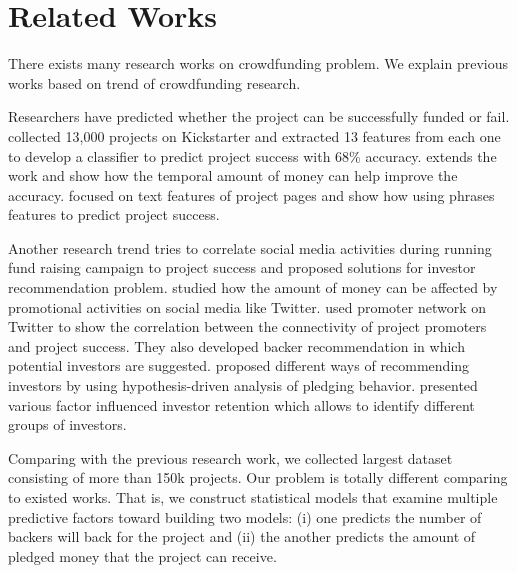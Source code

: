 \section{Related Works}
There exists many research works on crowdfunding problem. We explain previous works based on trend of crowdfunding research.

Researchers have predicted whether the project can be successfully funded or fail. \cite{greenberg2015public} collected 13,000 projects on Kickstarter and extracted 13 features from each one to develop a classifier to predict project success with 68\% accuracy. \cite{Etter:2013} extends the work and show how the temporal amount of money can help improve the accuracy. \cite{Mitra:2014} focused on text features of project pages and show how using phrases features to predict project success.

Another research trend tries to correlate social media activities during running fund raising campaign to project success and proposed solutions for investor recommendation problem. \cite{lu:2014} studied how the amount of money can be  affected by promotional activities on social media like Twitter. \cite{Rakesh:2015} used promoter network on Twitter to show the correlation between the connectivity of project promoters and project success. They also developed backer recommendation in which potential investors are suggested. \cite{an2014recommending} proposed different ways of recommending investors by using hypothesis-driven analysis of pledging behavior. \cite{althoff2015donor} presented various factor influenced investor retention which allows to identify different groups of investors.

Comparing with the previous research work, we collected largest dataset consisting of more than 150k projects. Our problem is totally different comparing to existed works. That is, we construct statistical models that examine multiple predictive factors toward building two models: (i) one predicts the number of backers will back for the project and (ii) the another predicts the amount of pledged money that the project can receive.
